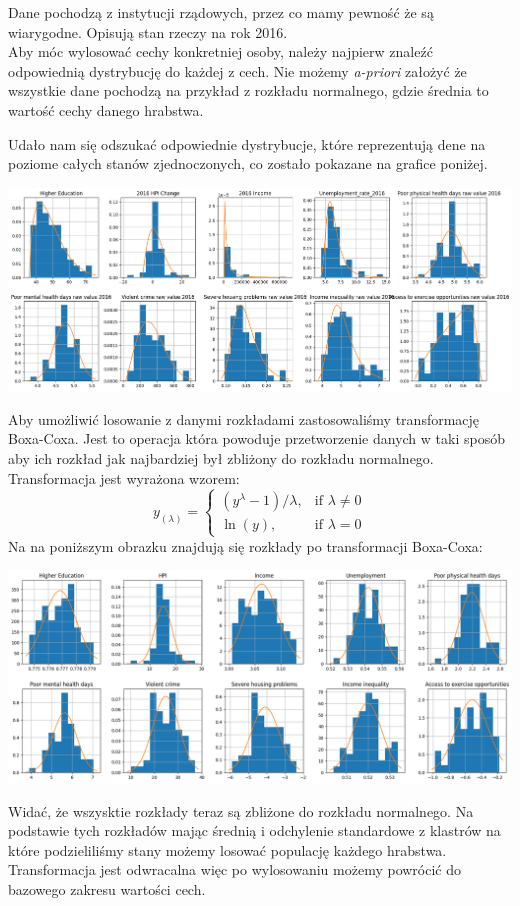 \documentclass[a4paper,12pt]{article}
\begin{document}
Dane pochodzą z instytucji rządowych, przez co mamy pewność że są wiarygodne. Opisują stan rzeczy na rok 2016.\\

Aby móc wylosować cechy konkretniej osoby, należy najpierw znaleźć odpowiednią dystrybucję do każdej z cech. Nie możemy \textit{a-priori} założyć że wszystkie dane pochodzą na przykład z rozkładu normalnego, gdzie średnia to wartość cechy danego hrabstwa.

Udało nam się odszukać odpowiednie dystrybucje, które reprezentują dene na poziome całych stanów zjednoczonych, co zostało pokazane na grafice poniżej.

\begin{center}
    \includegraphics*[width=15cm]{./pictures/distributions.png}
\end{center}

Aby umożliwić losowanie z danymi rozkładami zastosowaliśmy transformację Boxa-Coxa. Jest to operacja która powoduje przetworzenie danych w taki sposób aby ich rozkład jak najbardziej był zbliżony do rozkładu normalnego. Transformacja jest wyrażona wzorem: 
\begin{equation}
    y_(\lambda) = 
    \begin{cases}
    (y^\lambda - 1)/\lambda, & \text{if } \lambda \not = 0\\
    \ln(y),               & \text{if } \lambda = 0
    \end{cases}
\end{equation}
Na na poniższym obrazku znajdują się rozkłady po transformacji Boxa-Coxa:
\begin{center}
    \includegraphics*[width=15cm]{./pictures/box_cox_dist.png}
\end{center}
Widać, że wszysktie rozkłady teraz są zbliżone do rozkładu normalnego. Na podstawie tych rozkładów mając średnią i odchylenie standardowe z klastrów na które podzieliliśmy stany możemy losować populację każdego hrabstwa. Transformacja jest odwracalna więc po wylosowaniu możemy powrócić do bazowego zakresu wartości cech. 
\end{document}
